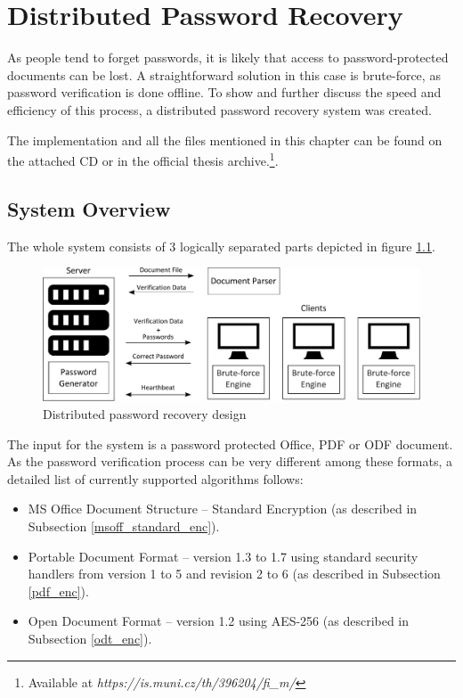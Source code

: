 \documentclass[11pt,oneside]{fithesis2}
\begin{document}
\chapter{Distributed Password Recovery}

As people tend to forget passwords, it is likely that access to password-protected documents can be lost. A straightforward solution in this case is brute-force, as password verification is done offline. To show and further discuss the speed and efficiency of this process, a distributed password recovery system was created.

The implementation and all the files mentioned in this chapter can be found on the attached CD or in the official thesis archive.\footnote{Available at \textit{https://is.muni.cz/th/396204/fi\_m/}}.

\section{System Overview}

The whole system consists of 3 logically separated parts depicted in figure \ref{ddpbf_design}. 

\begin{figure}[ht]
	\centering
	\includegraphics[width=1\textwidth]{figures/ddpbf_design.pdf}
	\caption{Distributed password recovery design}
	\label{ddpbf_design}
\end{figure}

The input for the system is a password protected Office, PDF or ODF document. As the password verification process can be very different among these formats, a detailed list of currently supported algorithms follows:

\begin{itemize}
\setlength\itemsep{0.1em}
	\item{MS Office Document Structure -- Standard Encryption (as described in Subsection \ref{msoff_standard_enc}).}
	\item{Portable Document Format --  version 1.3 to 1.7 using standard security handlers from version 1 to 5 and revision 2 to 6 (as described in Subsection \ref{pdf_enc}).}
	\item{Open Document Format – version 1.2 using AES-256 (as described in Subsection \ref{odt_enc}).}
\end{itemize}
\end{document}
